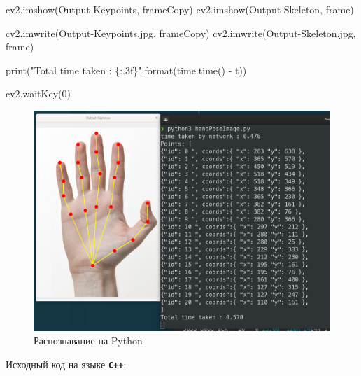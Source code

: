\documentclass[
  12pt,
  a4paper,
]{article}
\newenvironment{Shaded}{}{}
\newcommand{\BuiltInTok}[1]{#1}
\newcommand{\DecValTok}[1]{\textcolor[rgb]{0.25,0.63,0.44}{#1}}
\newcommand{\NormalTok}[1]{#1}
\newcommand{\OperatorTok}[1]{\textcolor[rgb]{0.40,0.40,0.40}{#1}}
\newcommand{\SpecialCharTok}[1]{\textcolor[rgb]{0.25,0.44,0.63}{#1}}
\newcommand{\StringTok}[1]{\textcolor[rgb]{0.25,0.44,0.63}{#1}}
\begin{document}
\begin{Shaded}
\begin{Highlighting}[numbers=left,,]
\NormalTok{cv2.imshow(}\StringTok{\textquotesingle{}Output{-}Keypoints\textquotesingle{}}\NormalTok{, frameCopy)}
\NormalTok{cv2.imshow(}\StringTok{\textquotesingle{}Output{-}Skeleton\textquotesingle{}}\NormalTok{, frame)}


\NormalTok{cv2.imwrite(}\StringTok{\textquotesingle{}Output{-}Keypoints.jpg\textquotesingle{}}\NormalTok{, frameCopy)}
\NormalTok{cv2.imwrite(}\StringTok{\textquotesingle{}Output{-}Skeleton.jpg\textquotesingle{}}\NormalTok{, frame)}

\BuiltInTok{print}\NormalTok{(}\StringTok{"Total time taken : }\SpecialCharTok{\{:.3f\}}\StringTok{"}\NormalTok{.}\BuiltInTok{format}\NormalTok{(time.time() }\OperatorTok{{-}}\NormalTok{ t))}

\NormalTok{cv2.waitKey(}\DecValTok{0}\NormalTok{)}
\end{Highlighting}
\end{Shaded}

\begin{figure}
\centering
\includegraphics{pics/hw2_pythonHand_out.png}
\caption{Распознавание на Python}
\end{figure}

Исходный код на языке \textbf{\texttt{C++}}:
\end{document}
